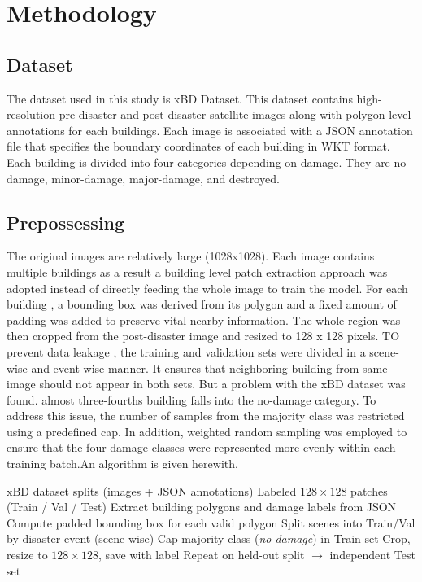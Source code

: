 \documentclass[conference]{IEEEtran}
\begin{document}
\section{Methodology}

\subsection{Dataset}
The dataset used in this study is xBD Dataset. This dataset contains high-resolution pre-disaster and post-disaster satellite images along with polygon-level annotations for each buildings. Each image is associated with a JSON annotation file that specifies the boundary coordinates of each building in WKT format. Each building is divided into four categories depending on damage. They are no-damage, minor-damage, major-damage, and destroyed.
\subsection{Prepossessing} 
The original images are relatively large (1028x1028). Each image contains multiple buildings as a result a building level patch extraction approach was adopted instead of directly feeding the whole image to train the model. For each building , a bounding box was derived from its polygon and a fixed amount of padding was added to preserve vital nearby information. The whole region was then cropped from the post-disaster image and resized to 128 x 128 pixels. TO prevent data leakage , the training and validation sets were divided in a scene-wise and event-wise manner. It ensures that neighboring building from same image should not appear in both sets. But a problem with the xBD dataset was found. almost three-fourths building falls into the no-damage category. To address this issue, the number of samples from the majority class was restricted using a predefined cap. In addition, weighted random sampling was employed to ensure that the four damage classes were represented more evenly within each training batch.An algorithm is given herewith.


\begin{algorithm}[H]
\caption{xBD Building Patch Preparation}
\label{alg:patch_prep}
\begin{algorithmic}[1]
\REQUIRE xBD dataset splits (images + JSON annotations)
\ENSURE Labeled $128\times128$ patches (Train / Val / Test)
    \STATE Extract building polygons and damage labels from JSON
    \STATE Compute padded bounding box for each valid polygon
\ENDFOR
\STATE Split scenes into Train/Val by disaster event (scene-wise)
\STATE Cap majority class (\textit{no-damage}) in Train set
    \STATE Crop, resize to $128\times128$, save with label
\ENDFOR
\STATE Repeat on held-out split $\rightarrow$ independent Test set
\end{algorithmic}
\end{algorithm}
\end{document}
